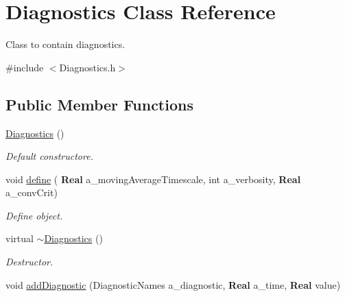 \hypertarget{class_diagnostics}{}\section{Diagnostics Class Reference}
\label{class_diagnostics}


Class to contain diagnostics.  




{\ttfamily \#include $<$Diagnostics.\+h$>$}

\subsection*{Public Member Functions}
\begin{DoxyCompactItemize}
\item 
\mbox{\label{class_diagnostics_a24c4f22a9628a083b82a194089cfdd19}} 
\hyperlink{class_diagnostics_a24c4f22a9628a083b82a194089cfdd19}{Diagnostics} ()
\begin{DoxyCompactList}\small\item\em Default constructore. \end{DoxyCompactList}\item 
\mbox{\label{class_diagnostics_a33a91e98836bc1c3bf022c09a97b5e51}} 
void \hyperlink{class_diagnostics_a33a91e98836bc1c3bf022c09a97b5e51}{define} (\textbf{ Real} a\+\_\+moving\+Average\+Timescale, int a\+\_\+verbosity, \textbf{ Real} a\+\_\+conv\+Crit)
\begin{DoxyCompactList}\small\item\em Define object. \end{DoxyCompactList}\item 
\mbox{\label{class_diagnostics_ad05cd98138d8ef3a0c1284412fbddd6b}} 
virtual \hyperlink{class_diagnostics_ad05cd98138d8ef3a0c1284412fbddd6b}{$\sim$\+Diagnostics} ()
\begin{DoxyCompactList}\small\item\em Destructor. \end{DoxyCompactList}\item 
\mbox{\label{class_diagnostics_a7a9d74a6ac4efbe40052bca9545a99b5}} 
void \hyperlink{class_diagnostics_a7a9d74a6ac4efbe40052bca9545a99b5}{add\+Diagnostic} (Diagnostic\+Names a\+\_\+diagnostic, \textbf{ Real} a\+\_\+time, \textbf{ Real} value)

\end{DoxyCompactItemize}
